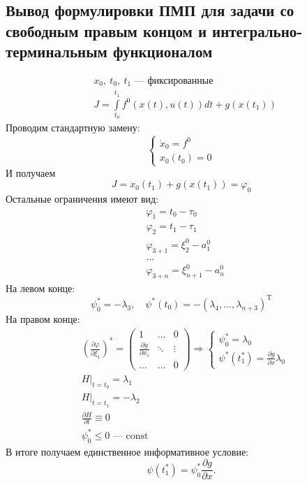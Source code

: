 \documentclass[oneside, final, 14pt, draft]{article}
\theoremstyle{definition}
\theoremstyle{definition}
\theoremstyle{remark}
\theoremstyle{theorem}
\renewcommand{\leq}{\leqslant}
\begin{document}
\subsection{Вывод формулировки ПМП для задачи со свободным правым концом и интегрально-терминальным функционалом}
\begin{align*}
&x_0,\ t_0,\ t_1 \text{ --- фиксированные}\\
&J = \int\limits_{t_0}^{t_1} f^0 (x(t), u(t))dt + g(x(t_1))
\end{align*}
Проводим стандартную замену:
\begin{equation*}
\begin{cases}
\dot{x}_0 = f^0\\ 
x_0(t_0) = 0
\end{cases}
\end{equation*}
И получаем
$$  J = x_0(t_1) + g(x(t_1)) = \varphi_0$$
Остальные ограничения имеют вид:
\begin{align*}
&\varphi_1 = t_0 - \tau_0\\
&\varphi_2 = t_1 - \tau_1\\
&\varphi_{3 + 1} = \xi_2^0 - a_1^0\\
&\ldots\\
&\varphi_{3 + n} = \xi_{n + 1}^0 - a_n^0
\end{align*}
На левом конце:
$$ \psi_0^* = -\lambda_3, \quad \psi^*(t_0) = -(\lambda_4,\ldots, \lambda_{n+3})^\mathrm{T}$$
На правом конце:
\begin{align*}
&\left( \frac{\partial\varphi}{\partial \xi_1}\right)^* = \begin{pmatrix}
	1 & \dots & 0 \\
	\frac{\partial g}{\partial x_i}& \ddots & \vdots \\
	\ldots & \dots & 0
\end{pmatrix} \Rightarrow 
\begin{cases}
	\psi_0^*=\lambda_0\\
	\psi^*(t_1^*) = \frac{\partial g}{\partial x} \lambda_0
\end{cases}\\
&H|_{t = t_0} = \lambda_1\\
&H|_{t = t_1} = -\lambda_2\\
&\frac{\partial H}{\partial t} \equiv 0\\
&\psi_0^* \leq 0 \text{ --- const}
\end{align*}
В итоге получаем единственное информативное условие:
$$\psi(t_1^*) = \psi_0^*\frac{\partial g}{\partial x}.$$
\end{document}
